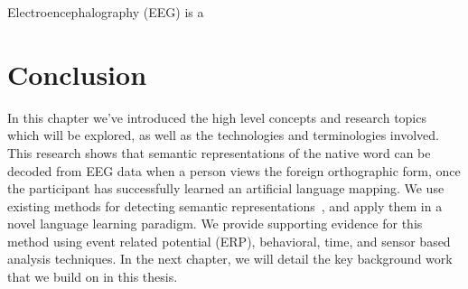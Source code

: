 Electroencephalography (EEG) is a 




\section{Conclusion}

In this chapter we've introduced the high level concepts and research topics 
which will be explored, as well as the technologies and terminologies involved.  
This research shows that semantic representations of the native word can be 
decoded from EEG data when a person views the foreign orthographic form, once 
the participant has successfully learned an artificial language mapping.  We 
use existing methods for detecting semantic representations~\cite{Sudre2012}, 
and apply them in a novel language learning paradigm. We provide supporting 
evidence for this method using event related potential (ERP), behavioral, time, 
and sensor based analysis techniques. In the next chapter, we will detail the 
key background work that we build on in this thesis. 
